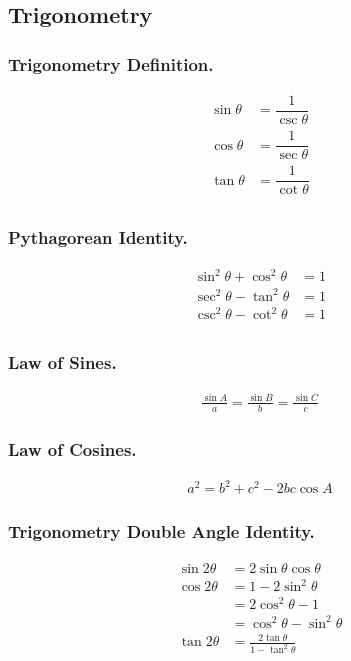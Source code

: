 \documentclass[../main.tex]{subfiles}
\begin{document}
\subsection*{Trigonometry}
\subsubsection*{Trigonometry Definition.}
\begin{align*}
    \sin \theta&=\dfrac{1}{\csc \theta}\\
    \cos \theta&=\dfrac{1}{\sec \theta}\\
    \tan \theta&=\dfrac{1}{\cot \theta}\\
\end{align*}

\subsubsection*{Pythagorean Identity.}
\begin{align*}
    \sin^2 \theta+ \cos^2 \theta &=1\\
    \sec^2 \theta- \tan^2 \theta &=1\\
    \csc^2 \theta- \cot^2 \theta &=1\\
\end{align*}

\subsubsection*{Law of Sines.}
\begin{align*}
    \frac{\sin A}{a}=\frac{\sin B}{b}=\frac{\sin C}{c}
\end{align*}

\subsubsection*{Law of Cosines.}
\begin{align*}
    a^2=b^2+c^2-2bc\cos A
\end{align*}

\subsubsection*{Trigonometry Double Angle Identity.}
\begin{align*}
    \sin 2\theta&=2\sin \theta \cos \theta\\
    \cos 2 \theta&=1-2\sin^2\theta\\
    &=2\cos^2\theta -1\\
    &=\cos^2\theta-\sin^2\theta\\
    \tan 2\theta&=\frac{2\tan\theta}{1-\tan^2\theta}
\end{align*}
\end{document}
